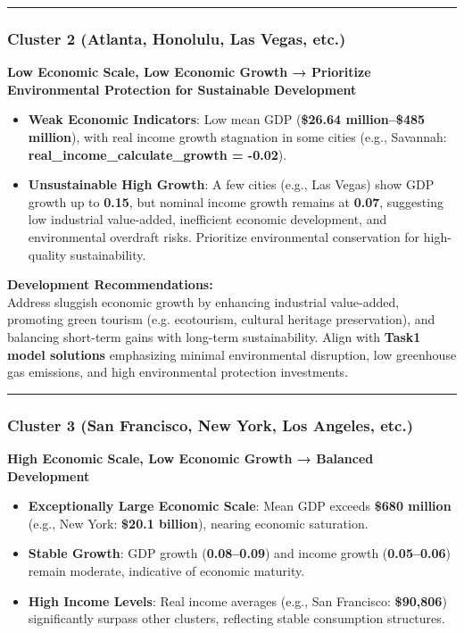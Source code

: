 \documentclass{mcmthesis}
\begin{document}
\vspace{1em}
\hrule
\vspace{1em}

\subsubsection*{Cluster 2 (Atlanta, Honolulu, Las Vegas, etc.)}
\textbf{Low Economic Scale, Low Economic Growth → Prioritize Environmental Protection for Sustainable Development}
\begin{itemize}
    \item \textbf{Weak Economic Indicators}: Low mean GDP (\textbf{\$26.64 million--\$485 million}), with real income growth stagnation in some cities (e.g., Savannah: \textbf{real\_income\_calculate\_growth = -0.02}).
    \item \textbf{Unsustainable High Growth}: A few cities (e.g., Las Vegas) show GDP growth up to \textbf{0.15}, but nominal income growth remains at \textbf{0.07}, suggesting low industrial value-added, inefficient economic development, and environmental overdraft risks. Prioritize environmental conservation for high-quality sustainability.
\end{itemize}

\textbf{Development Recommendations:} \\
Address sluggish economic growth by enhancing industrial value-added, promoting green tourism (e.g. ecotourism, cultural heritage preservation), and balancing short-term gains with long-term sustainability. Align with \textbf{Task1 model solutions} emphasizing minimal environmental disruption, low greenhouse gas emissions, and high environmental protection investments.

\vspace{1em}
\hrule
\vspace{1em}

\subsubsection*{Cluster 3 (San Francisco, New York, Los Angeles, etc.)}
\textbf{High Economic Scale, Low Economic Growth → Balanced Development}
\begin{itemize}
    \item \textbf{Exceptionally Large Economic Scale}: Mean GDP exceeds \textbf{\$680 million} (e.g., New York: \textbf{\$20.1 billion}), nearing economic saturation.
    \item \textbf{Stable Growth}: GDP growth (\textbf{0.08--0.09}) and income growth (\textbf{0.05--0.06}) remain moderate, indicative of economic maturity.
    \item \textbf{High Income Levels}: Real income averages (e.g., San Francisco: \textbf{\$90,806}) significantly surpass other clusters, reflecting stable consumption structures.
\end{itemize}
\end{document}
